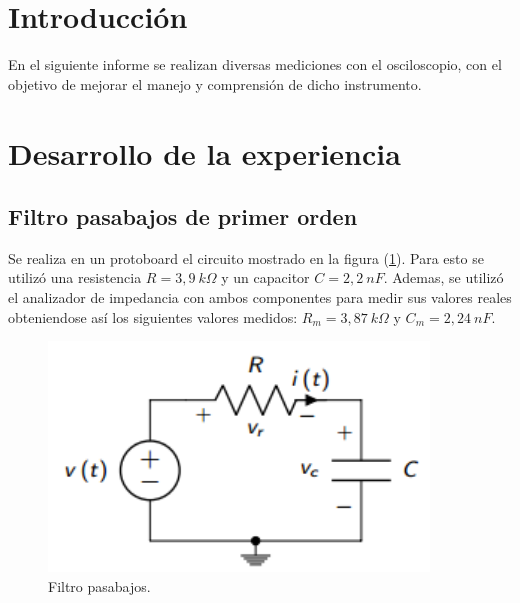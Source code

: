 \documentclass[a4paper]{article}
\begin{document}




\section*{Introducción}

En el siguiente informe se realizan diversas mediciones con el osciloscopio, con el objetivo de mejorar el manejo y comprensión de dicho instrumento.

\section*{Desarrollo de la experiencia}

\subsection*{Filtro pasabajos de primer orden}

Se realiza en un protoboard el circuito mostrado en la figura (\ref{graf:pasabajos}). Para esto se utilizó una resistencia $ R = 3,9 \ k\Omega $ y un capacitor $ C = 2,2 \ nF $. Ademas, se utilizó el analizador de impedancia con ambos componentes para medir sus valores reales obteniendose así los siguientes valores medidos: $ R_{m} = 3,87 \ k\Omega $ y $ C_{m} = 2,24 \ nF $.

\begin{figure}[H]
	\centering
	\includegraphics[width=0.9\textwidth]{Filtro-pasabajos.PNG}
	\caption{Filtro pasabajos.} 
	\label{graf:pasabajos}
\end{figure}
\end{document}

